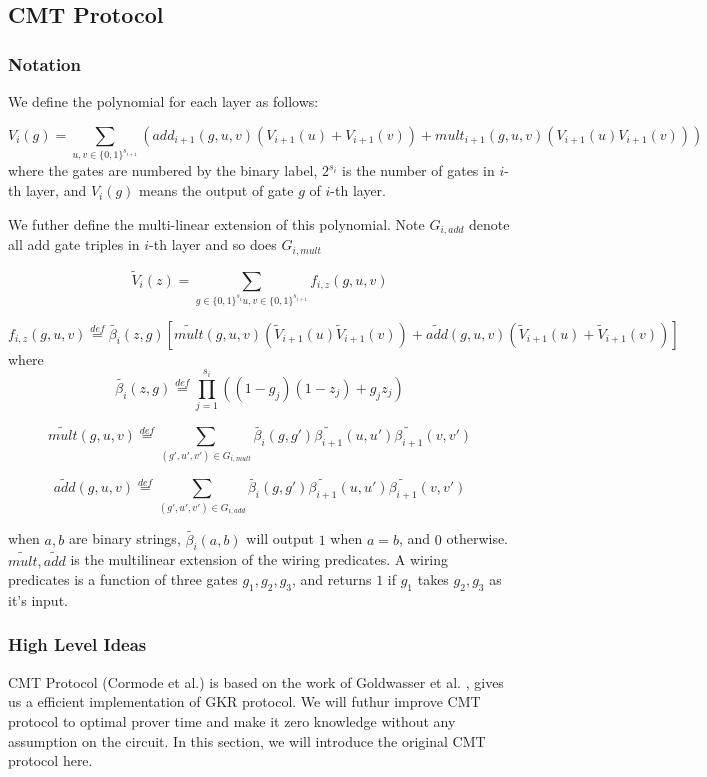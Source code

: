 
\subsection{CMT Protocol}

\subsubsection{Notation}
We define the polynomial for each layer as follows:
\begin{definition} 
$$V_i(g)=\sum_{u, v \in \{0,1\}^{s_{i+1}}}(add_{i+1}(g,u,v)(V_{i+1}(u)+V_{i+1}(v))+mult_{i+1}(g,u,v)(V_{i+1}(u)V_{i+1}(v)))$$
where the gates are numbered by the binary label, $2^{s_i}$ is the number of gates in $i$-th layer, and $V_i(g)$ means the output of gate $g$ of $i$-th layer.
\end{definition}

We futher define the multi-linear extension of this polynomial. Note $G_{i,add}$ denote all add gate triples in $i$-th layer and so does $G_{i,mult}$

\begin{definition}
\label{def::multilinear}
$$\tilde{V}_{i}(z)=\sum_{g\in\{0,1\}^{s_i} u, v\in \{0,1\}^{s_{i+1}}}f_{i,z}(g,u,v)$$

$$f_{i,z}(g,u,v)\overset{def}{=}\tilde{\beta_{i}}(z, g)[\tilde{mult}(g, u, v)(\tilde{V}_{i+1}(u)\tilde{V}_{i+1}(v))+\tilde{add}(g,u,v)(\tilde{V}_{i+1}(u)+\tilde{V}_{i+1}(v))]$$
where $$\tilde{\beta_{i}}(z,g)\overset{def}{=}\prod_{j=1}^{s_{i}}((1-g_{j})(1-z_{j})+g_{j}z_{j})$$

$$\tilde{mult}(g,u,v)\overset{def}{=}\sum_{(g', u', v')\in G_{i,mult}}\tilde{\beta_{i}}(g,g')\tilde{\beta_{i+1}}(u,u')\tilde{\beta_{i+1}}(v,v')$$

$$\tilde{add}(g,u,v)\overset{def}{=}\sum_{(g', u', v')\in G_{i,add}}\tilde{\beta_{i}}(g,g')\tilde{\beta_{i+1}}(u,u')\tilde{\beta_{i+1}}(v,v')$$

when $a, b$ are binary strings, $\tilde{\beta_{i}}(a, b)$ will output $1$ when $a=b$, and $0$ otherwise. $\tilde{mult},\tilde{add}$ is the multilinear extension of the wiring predicates. A wiring predicates is a function of three gates $g_1, g_2, g_3$, and returns $1$ if $g_1$ takes $g_2, g_3$ as it's input.

\end{definition}

\subsubsection{High Level Ideas}
CMT Protocol (Cormode et al.)\cite{CMT} is based on the work of Goldwasser et al. \cite{GKR}, gives us a efficient implementation of GKR protocol. We will futhur improve CMT protocol to optimal prover time and make it zero knowledge without any assumption on the circuit. In this section, we will introduce the original CMT protocol here.

